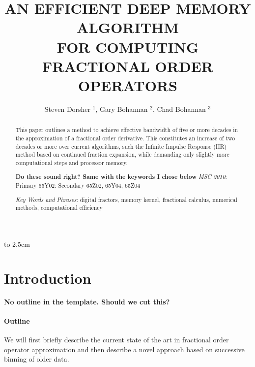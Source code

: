 \documentclass[twoside,reqno,11pt]{fcaa}
\title[AN EFFICIENT DEEP MEMORY ALGORITHM \dots]{AN EFFICIENT DEEP MEMORY ALGORITHM \\ [4pt] FOR COMPUTING FRACTIONAL ORDER OPERATORS}
\author[S. Dorsher, G. Bohannan, C. Bohannan]{Steven Dorsher $^1$, Gary Bohannan $^2$, Chad Bohannan $^3$}
\begin{document}
 \vbox to 2.5cm { \vfill }


 \bigskip \medskip

 \begin{abstract}

This paper outlines a method to achieve effective bandwidth of five or
more decades in the approximation of a fractional order
derivative. This constitutes an increase of two decades or more over
current algorithms, such the Infinite Impulse Response (IIR) method
based on continued fraction expansion, while demanding only slightly
more computational steps and processor memory.

 \medskip

{\bf Do these sound right? Same with the keywords I chose below}
{\it MSC 2010\/}: Primary 65Y02: Secondary 65Z02, 65Y04, 65Z04

 \smallskip

{\it Key Words and Phrases}: digital fractors, memory kernel,
fractional calculus, numerical methods, computational efficiency

\end{abstract}

 \maketitle

 \vspace*{-16pt}


\section{Introduction}\label{sec:intro}
\setcounter{section}{1}
\setcounter{equation}{0}



{\bf No outline in the template. Should we cut this?}
\paragraph{Outline\\}
We will first briefly describe the current state of the art in
fractional order operator approximation and then describe a novel
approach based on successive binning of older data.
\end{document}
